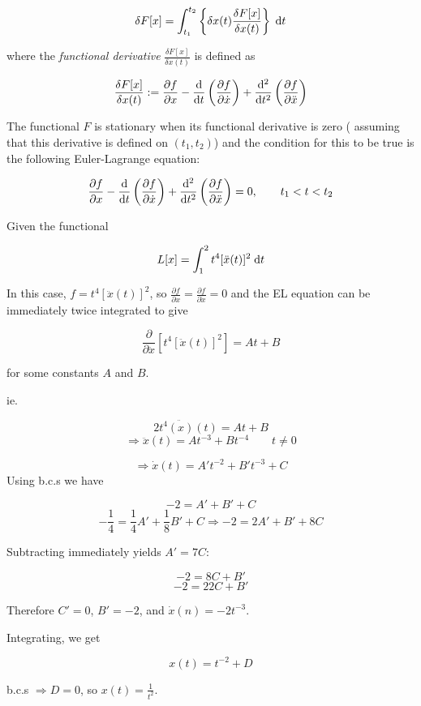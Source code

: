 \documentclass[a4paper]{article}
\begin{document}
\[ \delta F[x] = \int_{t_{1}}^{t_{2}} \left\{ \delta x(t) \frac{ \delta F[x]}{\delta x(t)}  \right\}  \; \mathrm{d} t  \]


where the \emph{functional derivative} $ \frac{ \delta F[x]}{\delta x(t)} $ is defined as 


\[ \frac{ \delta F[x]}{\delta x(t)} := \frac{\partial f }{\partial x} -  \frac{\mathrm{d} }{\mathrm{d} t} \left(  \frac{\partial f }{\partial \dot{x}} \right)  +  \frac{\mathrm{d}^{2} }{\mathrm{d} t^{2}} \left(  \frac{\partial f }{\partial \ddot{x}} \right)   \]

The functional $ F $ is stationary when its functional derivative is zero ( assuming that this derivative is defined on $ (t_{1},t_{2}) $) and the condition for this to be true is the following Euler-Lagrange equation:

\[ \frac{\partial f }{\partial x} -  \frac{\mathrm{d} }{\mathrm{d} t} \left(  \frac{\partial f }{\partial \dot{x}} \right)  +  \frac{\mathrm{d}^{2} }{\mathrm{d} t^{2}} \left(  \frac{\partial f }{\partial \ddot{x}} \right) = 0, \qquad t_{1} < t < t_{2} \]


Given the functional

\[ L[x] = \int_{1}^{2} t^{4}  [\ddot{x}(t)]^{2} \; \mathrm{d} t  \]

In this case, $ f =  t^{4} [\ddot{x}(t)]^{2}  $, so $   \frac{\partial f }{\partial x} = \frac{\partial f }{\partial \dot{x}} = 0 $ and the EL equation can be immediately twice integrated to give 

\[ \frac{\partial }{\partial \ddot{x}} \left[ t^{4} [\ddot{x}(t)]^{2} \right] = At + B   \]

for some constants $ A $ and $ B $.

ie.

\[  2 t^{4}  \ddot{(x)}(t) = At + B \]
\[ \Rightarrow \ddot{x}(t) = At^{-3} + B t^{-4} \qquad t \neq 0 \]

\[ \Rightarrow \dot{x}(t) = A' t^{-2} + B' t^{-3} + C \]
Using b.c.s we have

\[ -2 = A' + B' + C \]
\[ -\frac{1}{4} = \frac{1}{4} A' + \frac{1}{8} B' + C \Rightarrow -2 = 2 A' + B' + 8C \]

Subtracting immediately yields $ A' = 7 C $:

\[ -2 = 8 C + B' \]
\[ -2 = 22C + B' \]

Therefore $ C' = 0 $, $ B' = -2 $, and $ \dot{x}(n) = -2 t^{-3} $.

Integrating, we get

\[ x(t) = t^{-2} + D \]

b.c.s $ \Rightarrow D = 0 $, so $ x(t) = \frac{1}{t^{2}} $. 
\end{document}

